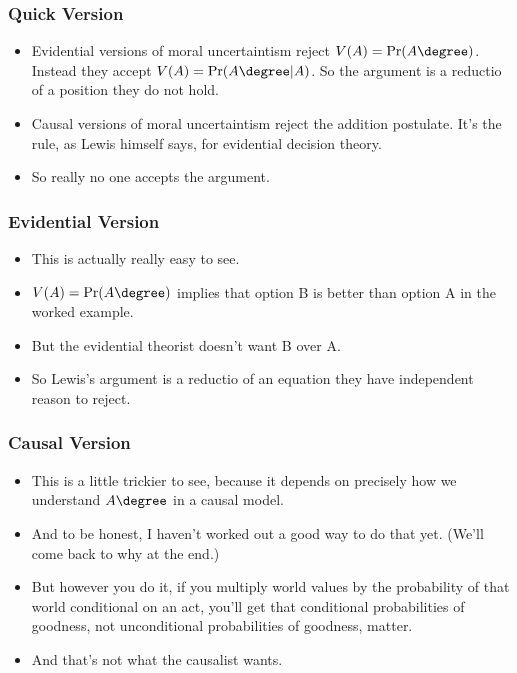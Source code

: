 \begin{frame}[fragile]
\frametitle{Quick Version}
\label{quickversion}

\begin{itemize}
\item{} Evidential versions of moral uncertaintism reject $V(A) = \Pr(A\degree)$. Instead they accept $V(A) = \Pr(A\degree | A)$. So the argument is a reductio of a position they do not hold. \pause 

\item{} Causal versions of moral uncertaintism reject the addition postulate. It's the rule, as Lewis himself says, for evidential decision theory. \pause 

\item{} So really no one accepts the argument.

\end{itemize}

\end{frame}

\begin{frame}[fragile]
\frametitle{Evidential Version}
\label{evidentialversion}

\begin{itemize}
\item{} This is actually really easy to see.

\item{} $V(A) = \Pr(A\degree)$ implies that option B is better than option A in the worked example.

\item{} But the evidential theorist doesn't want B over A.

\item{} So Lewis's argument is a reductio of an equation they have independent reason to reject.

\end{itemize}

\end{frame}

\begin{frame}[fragile]
\frametitle{Causal Version}
\label{causalversion}

\begin{itemize}
\item{} This is a little trickier to see, because it depends on precisely how we understand $A\degree$ in a causal model.

\item{} And to be honest, I haven't worked out a good way to do that yet. (We'll come back to why at the end.)

\item{} But however you do it, if you multiply world values by the probability of that world conditional on an act, you'll get that conditional probabilities of goodness, not unconditional probabilities of goodness, matter.

\item{} And that's not what the causalist wants.

\end{itemize}

\end{frame}

